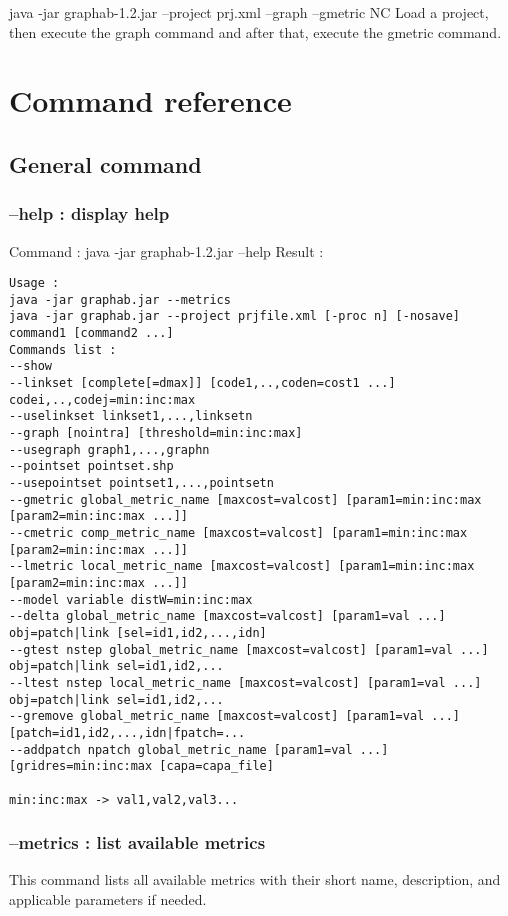\documentclass[a4paper,10pt]{report}
\newenvironment{cmd}
{\quote\Verbatim}
{\endVerbatim\endquote}
\begin{document}
\begin{cmd}
java -jar graphab-1.2.jar --project prj.xml --graph --gmetric NC  
\end{cmd}
Load a project, then execute the graph command and after that, execute the gmetric command.



\chapter{Command reference}
\section{General command}
\subsection{--help : display help}
Command :
\begin{cmd}
java -jar graphab-1.2.jar --help
\end{cmd}
Result :
\begin{verbatim}
Usage :
java -jar graphab.jar --metrics
java -jar graphab.jar --project prjfile.xml [-proc n] [-nosave] command1 [command2 ...]
Commands list :
--show
--linkset [complete[=dmax]] [code1,..,coden=cost1 ...] codei,..,codej=min:inc:max
--uselinkset linkset1,...,linksetn
--graph [nointra] [threshold=min:inc:max]
--usegraph graph1,...,graphn
--pointset pointset.shp
--usepointset pointset1,...,pointsetn
--gmetric global_metric_name [maxcost=valcost] [param1=min:inc:max [param2=min:inc:max ...]]
--cmetric comp_metric_name [maxcost=valcost] [param1=min:inc:max [param2=min:inc:max ...]]
--lmetric local_metric_name [maxcost=valcost] [param1=min:inc:max [param2=min:inc:max ...]]
--model variable distW=min:inc:max
--delta global_metric_name [maxcost=valcost] [param1=val ...] obj=patch|link [sel=id1,id2,...,idn]
--gtest nstep global_metric_name [maxcost=valcost] [param1=val ...] obj=patch|link sel=id1,id2,...
--ltest nstep local_metric_name [maxcost=valcost] [param1=val ...] obj=patch|link sel=id1,id2,...
--gremove global_metric_name [maxcost=valcost] [param1=val ...] [patch=id1,id2,...,idn|fpatch=...
--addpatch npatch global_metric_name [param1=val ...] [gridres=min:inc:max [capa=capa_file] 

min:inc:max -> val1,val2,val3...
\end{verbatim}

\subsection{--metrics : list available metrics}
This command lists all available metrics with their short name, description, and applicable parameters if needed.
\end{document}
